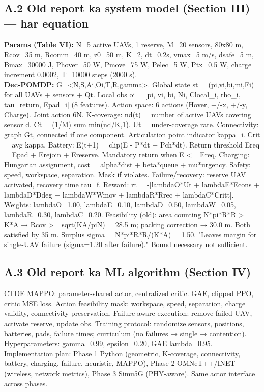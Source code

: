 \documentclass[10pt]{article}
\begin{document}
\subsection{A.2 Old report ka system model (Section III) --- har equation}
\textbf{Params (Table VI):} N=5 active UAVs, 1 reserve, M=20 sensors, 80x80 m, Rcov=35 m, Rcomm=40 m, z0=50 m, K=2, dt=0.2s, vmax=5 m/s, dsafe=5 m, Bmax=30000 J, Phover=50 W, Pmove=75 W, Pelec=5 W, Ptx=0.5 W, charge increment 0.0002, T=10000 steps (2000 s).\\
\textbf{Dec-POMDP:} G=<N,S,{Ai},{Oi},T,R,gamma>. Global state st = (pi,vi,bi,mi,Fi) for all UAVs + sensors + Qt. Local obs oi = [pi, vi, bi, Ni, Clocal\_i, rho\_i, tau\_return, Epad\_i] (8 features). Action space: 6 actions (Hover, +/-x, +/-y, Charge). Joint action 6N. K-coverage: nd(t) = number of active UAVs covering sensor d. Ct = (1/M) sum min(nd/K,1). Ut = under-coverage rate. Connectivity: graph Gt, connected if one component. Articulation point indicator kappa\_i. Crit = avg kappa. Battery: E(t+1) = clip(E - P*dt + Pch*dt). Return threshold Ereq = Epad + Erejoin + Ereserve. Mandatory return when E <= Ereq. Charging: Hungarian assignment, cost = alpha*dist + beta*queue + mu*urgency. Safety: speed, workspace, separation. Mask if violates. Failure/recovery: reserve UAV activated, recovery time tau\_f. Reward: rt = -[lambdaO*Ut + lambdaE*Econs + lambdaD*Ddeg + lambdaW*Wmov + lambdaR*Rrec + lambdaC*Critt]. Weights: lambdaO=1.00, lambdaE=0.10, lambdaD=0.50, lambdaW=0.05, lambdaR=0.30, lambdaC=0.20. Feasibility (old): area counting N*pi*R*R >= K*A → Rcov >= sqrt(KA/piN) = 28.5 m; packing correction → 30.0 m. Both satisfied by 35 m. Surplus sigma = N*pi*R*R/(K*A) = 1.50. "Leaves margin for single-UAV failure (sigma=1.20 after failure)." Bound necessary not sufficient.

\subsection{A.3 Old report ka ML algorithm (Section IV)}
CTDE MAPPO: parameter-shared actor, centralized critic. GAE, clipped PPO, critic MSE loss. Action feasibility mask: workspace, speed, separation, charge validity, connectivity-preservation. Failure-aware execution: remove failed UAV, activate reserve, update obs. Training protocol: randomize sensors, positions, batteries, pads, failure times; curriculum (no failures → single → contention). Hyperparameters: gamma=0.99, epsilon=0.20, GAE lambda=0.95. Implementation plan: Phase 1 Python (geometric, K-coverage, connectivity, battery, charging, failure, heuristic, MAPPO), Phase 2 OMNeT++/INET (wireless, network metrics), Phase 3 Simu5G (PHY-aware). Same actor interface across phases.
\end{document}
